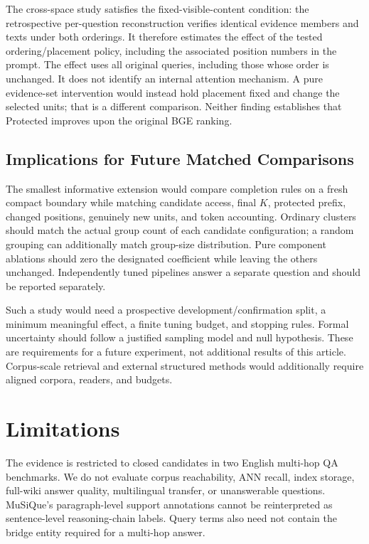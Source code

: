 \documentclass[11pt,a4paper]{article}
\begin{document}
The cross-space study satisfies the fixed-visible-content condition:
the retrospective per-question reconstruction verifies identical evidence
members and texts under both orderings. It therefore estimates the effect of
the tested ordering/placement policy, including the associated position
numbers in the prompt. The effect uses all original queries, including those
whose order is unchanged. It does not identify an internal attention mechanism.
A pure evidence-set intervention would instead hold placement fixed and
change the selected units; that is a different comparison. Neither finding
establishes that Protected improves upon the original BGE ranking.

\subsection{Implications for Future Matched Comparisons}
The smallest informative extension would compare completion rules on a fresh
compact boundary while matching candidate access, final $K$, protected
prefix, changed positions, genuinely new units, and token accounting.
Ordinary clusters should match the actual group count of each candidate
configuration; a random grouping can additionally match group-size
distribution. Pure component ablations should zero the designated
coefficient while leaving the others unchanged. Independently tuned
pipelines answer a separate question and should be reported separately.

Such a study would need a prospective development/confirmation split, a
minimum meaningful effect, a finite tuning budget, and stopping rules.
Formal uncertainty should follow a justified sampling model and null
hypothesis. These are requirements for a future experiment, not additional
results of this article. Corpus-scale retrieval and external structured
methods would additionally require aligned corpora, readers, and budgets.

\section{Limitations}
The evidence is restricted to closed candidates in two English multi-hop QA
benchmarks. We do not evaluate corpus reachability, ANN recall, index
storage, full-wiki answer quality, multilingual transfer, or unanswerable
questions. MuSiQue's paragraph-level support annotations cannot be
reinterpreted as sentence-level reasoning-chain labels. Query terms also
need not contain the bridge entity required for a multi-hop answer.
\end{document}
